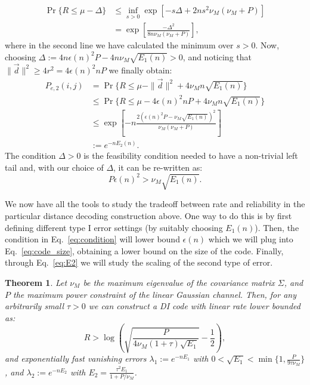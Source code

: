 \documentclass[10pt,conference]{IEEEtran}
\newtheorem{theorem}{Theorem}
\newcommand{\1}{\mathds{1}}
\newcommand{\pau}[1]{{\color{purple}#1}}
\begin{document}
\[
\begin{split}
\Pr\{R\leq\mu- \Delta\}&\leq\inf_{s>0}\exp\left[-s\Delta+2ns^2\nu_M\left(\nu_M+P\right)\right]\\
&=\exp\left[\frac{-\Delta^2}{8n\nu_M(\nu_M+P)}\right],
\end{split}
\]
where in the second line we have calculated the minimum over $s>0$. Now, choosing $\Delta:=4n\epsilon(n)^2P-4n\nu_M \sqrt{E_1(n)}>0$, and noticing that $\|\vec{d}\|^2\geq4r^2=4\epsilon(n)^2nP$ we finally obtain:
\begin{equation}\label{eq:E2}
\begin{split}
P_{e,2}(i,j)&=\Pr\{R\leq\mu- \|\vec{d}\|^2+4\nu_M n\sqrt{E_1(n)}\}\\
&\leq\Pr\{R\leq\mu- 4\epsilon(n)^2nP+4\nu_M n\sqrt{E_1(n)}\}\\
&\leq\exp\left[-n\frac{2\left(\epsilon(n)^2P-\nu_M\sqrt{E_1(n)}\right)^2}{\nu_M(\nu_M+P)}\right]\\
&:=e^{-nE_2(n)}.
\end{split}
\end{equation}
The condition $\Delta>0$ is the feasibility condition needed to have a non-trivial left tail and, with our choice of $\Delta$, it can be re-written as:
\begin{equation}\label{eq:condition}
P\epsilon(n)^2>\nu_M \sqrt{E_1(n)}.
\end{equation}

We now have all the tools to study the tradeoff between rate and reliability in the particular distance decoding construction above. One way to do this is by first defining different type I error settings (by suitably choosing $E_1(n)$). Then, the condition in Eq.~\eqref{eq:condition} will lower bound $\epsilon(n)$ which we will plug into Eq.~\eqref{eq:code_size}, obtaining a lower bound on the size of the code. Finally, through Eq.~\eqref{eq:E2} we will study the scaling of the second type of error. 



\begin{theorem}\label{thm:ach_linear}
Let $\nu_M$ be the maximum eigenvalue of the covariance matrix $\Sigma$, and $P$ the maximum power constraint of the linear Gaussian channel. Then, for any arbitrarily small $\tau>0$ we can construct a DI code with linear rate lower bounded as:
\[
R>\log\left(\sqrt{\frac{P}{4\nu_M(1+\tau) \sqrt{E_1}}}-\frac12\right),
\]
and exponentially fast vanishing errors $\lambda_1:=e^{-nE_1}$ with $0<\sqrt{E_1}< \min\{1,\frac{P}{9\tau\nu_M}\}$, and $\lambda_2:=e^{-nE_2}$ with $E_2=\frac{\tau^2E_1}{1+P/\nu_M}$.
\end{theorem}
\end{document}
